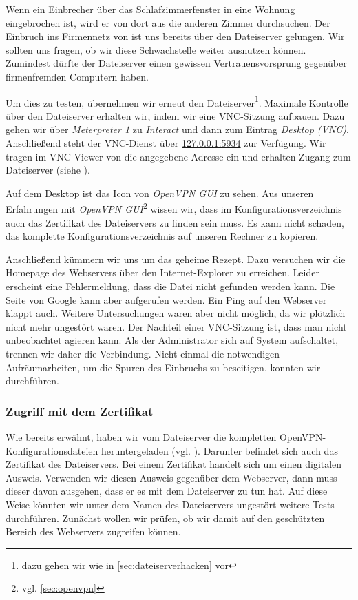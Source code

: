 Wenn ein Einbrecher über das Schlafzimmerfenster in eine Wohnung eingebrochen
ist, wird er von dort aus die anderen Zimmer durchsuchen. Der Einbruch ins
Firmennetz von \Mayerbrot{} ist uns bereits über den Dateiserver gelungen. Wir
sollten uns fragen, ob wir diese Schwachstelle weiter ausnutzen
können. Zumindest dürfte der Dateiserver einen gewissen Vertrauensvorsprung
gegenüber firmenfremden Computern haben.

Um dies zu testen, übernehmen wir erneut den Dateiserver\footnote{dazu gehen wir
  wie in \cref{sec:dateiserverhacken} vor}. Maximale Kontrolle über den
Dateiserver erhalten wir, indem wir eine VNC-Sitzung aufbauen. Dazu gehen wir
über \emph{Meterpreter 1} zu \emph{Interact} und dann zum Eintrag \emph{Desktop
  (VNC)}. Anschließend steht der VNC-Dienst über \url{127.0.0.1:5934} zur
Verfügung. Wir tragen im VNC-Viewer von \Metasploit{} die angegebene Adresse
ein und erhalten Zugang zum Dateiserver (siehe ).


Auf dem Desktop ist das Icon von \emph{OpenVPN GUI} zu sehen. Aus unseren
Erfahrungen mit \emph{OpenVPN GUI}\footnote{vgl. \cref{sec:openvpn}} wissen wir,
dass im Konfigurationsverzeichnis auch das Zertifikat des Dateiservers zu
finden sein muss. Es kann nicht schaden, das komplette Konfigurationsverzeichnis auf
unseren Rechner zu kopieren.

Anschließend kümmern wir uns um das geheime Rezept. Dazu versuchen wir die
Homepage des Webservers über den Internet-Explorer zu erreichen. Leider
erscheint eine Fehlermeldung, dass die Datei nicht gefunden werden kann. Die
Seite von Google kann aber aufgerufen werden. Ein Ping auf den Webserver klappt
auch. Weitere Untersuchungen waren aber nicht möglich, da wir plötzlich nicht
mehr ungestört waren. Der Nachteil einer VNC-Sitzung ist, dass man nicht
unbeobachtet agieren kann. Als der Administrator sich auf System aufschaltet,
trennen wir daher die Verbindung. Nicht einmal die notwendigen Aufräumarbeiten,
um die Spuren des Einbruchs zu beseitigen, konnten wir durchführen.

\subsubsection{Zugriff mit dem Zertifikat}

Wie bereits erwähnt, haben wir vom Dateiserver die kompletten
OpenVPN-Konfigurationsdateien heruntergeladen
(vgl. ). Darunter befindet sich auch das Zertifikat
des Dateiservers. Bei einem Zertifikat handelt sich um einen digitalen
Ausweis. Verwenden wir diesen Ausweis gegenüber dem Webserver, dann muss dieser
davon ausgehen, dass er es mit dem Dateiserver zu tun hat. Auf diese Weise
könnten wir unter dem Namen des Dateiservers ungestört weitere Tests
durchführen. Zunächst wollen wir prüfen, ob wir damit auf den geschützten Bereich
des Webservers zugreifen können.

